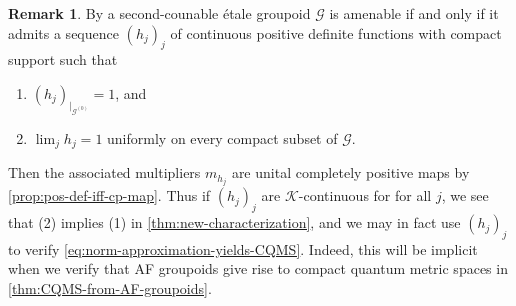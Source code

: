 \documentclass[11pt,a4paper,oneside,final,reqno]{amsart}
\theoremstyle{definition}
\newtheorem{remark}[lemma]{Remark}
\newcommand{\G}{\mathcal{G}}
\newcommand{\Go}{\mathcal{G}^{(0)}}
\newcommand{\cK}{\mathcal{K}}
\numberwithin{equation}{section}
\begin{document}
	\begin{remark}\label{remark:amenability-groupoid}
		By \cite[Proposition 2.2.13 and Proposition 2.2.7]{DelarocheRenaultAmenable2000} a second-counable \'etale groupoid $\G$ is amenable if and only if it admits a sequence $(h_j)_j$ of continuous positive definite functions with compact support such that
		\begin{enumerate}
			\item[(a)] $(h_j)_{\vert_{\Go} } = 1$, and
			\item[(b)] $\lim_j h_j = 1$ uniformly on every compact subset of $\G$. 
		\end{enumerate}
		Then the associated multipliers $m_{h_{j}}$ are unital completely positive maps by \cref{prop:pos-def-iff-cp-map}. Thus if $(h_j)_j$ are $\cK$-continuous for 
		for all $j$, we see that (2) implies (1) in \cref{thm:new-characterization}, and we may in fact use $(h_j)_j$ to verify \eqref{eq:norm-approximation-yields-CQMS}. 
		Indeed, 
		this will be implicit when we verify that AF groupoids give rise to compact quantum metric spaces in \cref{thm:CQMS-from-AF-groupoids}.  
	\end{remark}
		
\end{document}
